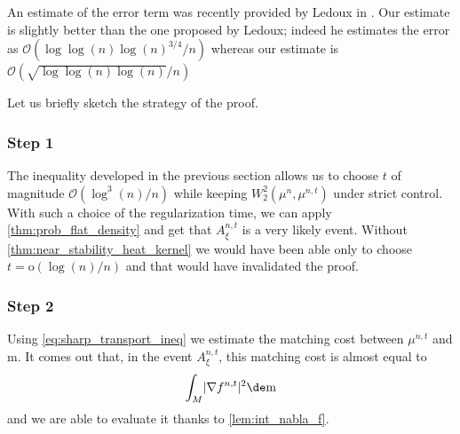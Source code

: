 \documentclass[10pt]{amsart}
\theoremstyle{plain}
\theoremstyle{definition}
\numberwithin{equation}{section}
\newcommand{\bigo}{\ensuremath{\mathcal{O}}}
\newcommand{\smallo}{\ensuremath{\mathrm{o}}}
\newcommand{\m}{\ensuremath{\mathrm m}}
\DeclarePairedDelimiter\abs{\lvert}{\rvert}
\begin{document}
An estimate of the error term was recently provided by Ledoux in
\cite[Eqs.\,(16) \& (17)]{Ledoux18}.
Our estimate is slightly better than the one proposed by Ledoux; indeed he estimates the error as
$\bigo(\log\log(n)\log(n)^{3/4}/n)$ whereas our estimate is $\bigo(\sqrt{\log\log(n)\log(n)}/n)$

Let us briefly sketch the strategy of the proof.

\subsubsection*{Step 1}
The inequality developed in the previous section allows us to choose $t$ of magnitude
$\bigo(\log^3(n)/n)$ while keeping $W^2_2(\mu^n,\mu^{n,t})$ under strict control. With such a choice
of the regularization time, we can apply \cref{thm:prob_flat_density} and get that $A^{n,t}_\xi$ is a very likely event.
Without \cref{thm:near_stability_heat_kernel} we would have been able only to choose
$t=\smallo(\log(n)/n)$ and that would have invalidated the proof.

\subsubsection*{Step 2}
Using \cref{eq:sharp_transport_ineq} we estimate the matching cost between $\mu^{n,t}$
and $\m$. It comes out that, in the event $A^{n,t}_\xi$, this matching cost is almost equal to
\begin{equation*}
\int_M \abs{\nabla f^{n,t}}^2\de\m
\end{equation*}
and we are able to evaluate it thanks to \cref{lem:int_nabla_f}.
\end{document}
